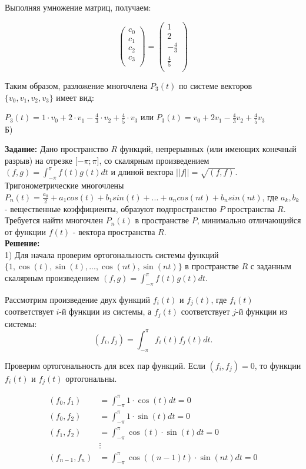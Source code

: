 \documentclass{article}
\begin{document}
Выполняя умножение матриц, получаем:

\[
\begin{pmatrix}
c_0 \\
c_1 \\
c_2 \\
c_3 \\
\end{pmatrix}
=
\begin{pmatrix}
1 \\
2 \\
-\frac{4}{3} \\
\frac{4}{5} \\
\end{pmatrix}
\]

Таким образом, разложение многочлена \(P_3(t)\) по системе векторов \(\{v_0, v_1, v_2, v_3\}\) имеет вид:

\(P_3(t) = 1 \cdot v_0 + 2 \cdot v_1 - \frac{4}{3} \cdot v_2 + \frac{4}{5} \cdot v_3\) или \(P_3(t) = v_0 + 2v_1 -\frac{4}{3}v_2 + \frac{4}{5}v_3\)\\


Б)


\textbf{Задание:} Дано пространство $R$ функций, непрерывных (или имеющих конечный разрыв) на отрезке [$-\pi; \pi$], со скалярным произведением $(f,g)=\int_{-\pi}^{\pi}f(t)g(t)dt$ и длиной вектора $||f||=\sqrt{(f,f)}$. Тригонометрические многочлены $P_n(t)=\frac{a_0}{2}+a_1cos(t)+b_1sin(t)+...+a_ncos(nt)+b_nsin(nt)$, где $a_k,b_k$ - вещественные коэффициенты, образуют подпространство $P$ пространства $R$. Требуется найти многочлен $P_n(t)$ в пространстве $P$, минимально отличающийся от функции $f(t)$ - вектора пространства $R$.\\

\textbf{Решение:}\\


1) Для начала проверим ортогональность системы функций $\{1, \cos(t), \sin(t), ..., \cos(nt), \sin(nt)\}$ в пространстве $R$ с заданным скалярным произведением $(f,g)=\int_{-\pi}^{\pi} f(t)g(t)dt$.

Рассмотрим произведение двух функций $f_i(t)$ и $f_j(t)$, где $f_i(t)$ соответствует $i$-й функции из системы, а $f_j(t)$ соответствует $j$-й функции из системы:
\[(f_i, f_j) = \int_{-\pi}^{\pi} f_i(t)f_j(t)dt.\]

Проверим ортогональность для всех пар функций. Если $(f_i, f_j) = 0$, то функции $f_i(t)$ и $f_j(t)$ ортогональны.

\begin{align*}
(f_0, f_1) &= \int_{-\pi}^{\pi} 1 \cdot \cos(t) dt = 0\\
(f_0, f_2) &= \int_{-\pi}^{\pi} 1 \cdot \sin(t) dt = 0\\
(f_1, f_2) &= \int_{-\pi}^{\pi} \cos(t) \cdot \sin(t) dt = 0\\
&\vdots\\
(f_{n-1}, f_n) &= \int_{-\pi}^{\pi} \cos((n-1)t) \cdot \sin(nt) dt = 0
\end{align*}
\end{document}
